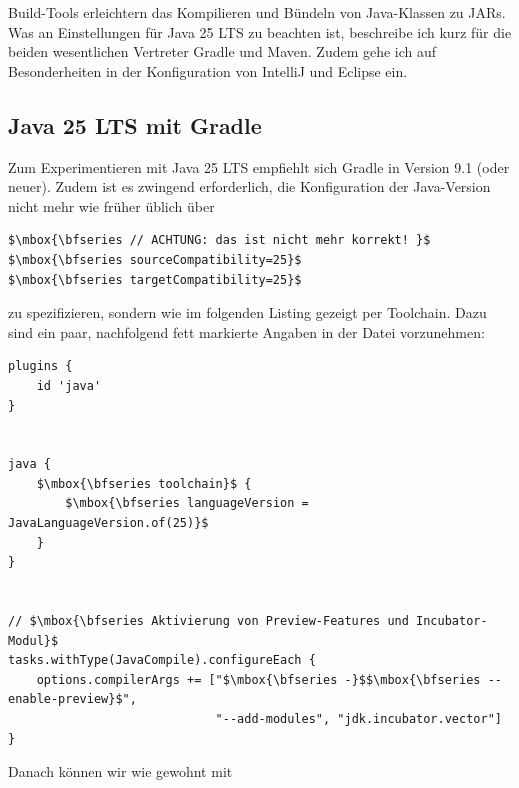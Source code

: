 Build-Tools erleichtern das Kompilieren und Bündeln von Java-Klassen zu JARs. Was an Einstellungen für
Java 25 LTS zu beachten ist, beschreibe ich kurz  für die beiden wesentlichen Vertreter Gradle und Maven.
Zudem gehe ich auf Besonderheiten in der Konfiguration von IntelliJ und Eclipse ein.




\subsection{Java 25 LTS mit Gradle}


Zum Experimentieren mit Java 25 LTS empfiehlt sich Gradle in Version 9.1 (oder neuer).
Zudem ist es zwingend erforderlich, die Konfiguration der Java-Version nicht mehr
wie früher üblich über


\lstset{mathescape=true}
\vspace{-0.5mm}
\begin{lstlisting}
$\mbox{\bfseries // ACHTUNG: das ist nicht mehr korrekt! }$
$\mbox{\bfseries sourceCompatibility=25}$
$\mbox{\bfseries targetCompatibility=25}$
\end{lstlisting}
\vspace{-0.5mm}
\lstset{mathescape=false}


zu spezifizieren, sondern wie im folgenden Listing gezeigt per Toolchain. Dazu sind ein paar, nachfolgend fett
markierte Angaben in der Datei  vorzunehmen:


\lstset{mathescape=true}
\vspace{-0.5mm}
\begin{lstlisting}
plugins {
	id 'java'
}


java {
	$\mbox{\bfseries toolchain}$ {
		$\mbox{\bfseries languageVersion = JavaLanguageVersion.of(25)}$
	}
}


// $\mbox{\bfseries Aktivierung von Preview-Features und Incubator-Modul}$
tasks.withType(JavaCompile).configureEach {
    options.compilerArgs += ["$\mbox{\bfseries -}$$\mbox{\bfseries --enable-preview}$",
                             "--add-modules", "jdk.incubator.vector"]
}
\end{lstlisting}
\vspace{-0.5mm}
\lstset{mathescape=false}


\vfill
\pagebreak
\noindent
Danach können wir wie gewohnt mit


